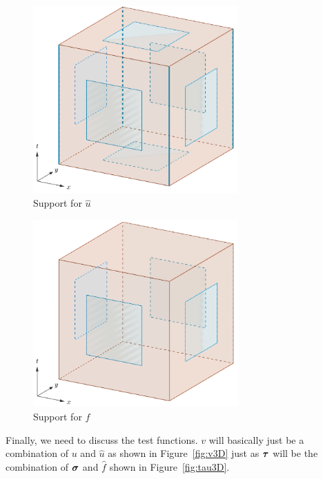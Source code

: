 \documentclass{article}
\begin{document}
\begin{figure}[p]
  \centering
  \includegraphics[width=0.7\textwidth]{trace3D.png}
  \caption{Support for $\hat u$}
  \label{fig:trace3D}
\end{figure}

\begin{figure}[p]
  \centering
  \includegraphics[width=0.7\textwidth]{flux3D.png}
  \caption{Support for $\hat f$}
  \label{fig:flux3D}
\end{figure}

Finally, we need to discuss the test functions. $v$ will basically just be a
combination of $u$ and $\hat u$ as shown in Figure~\ref{fig:v3D} just as
$\boldsymbol\tau$ will be the combination of $\boldsymbol\sigma$ and $\hat f$ shown in
Figure~\ref{fig:tau3D}.
\end{document}
